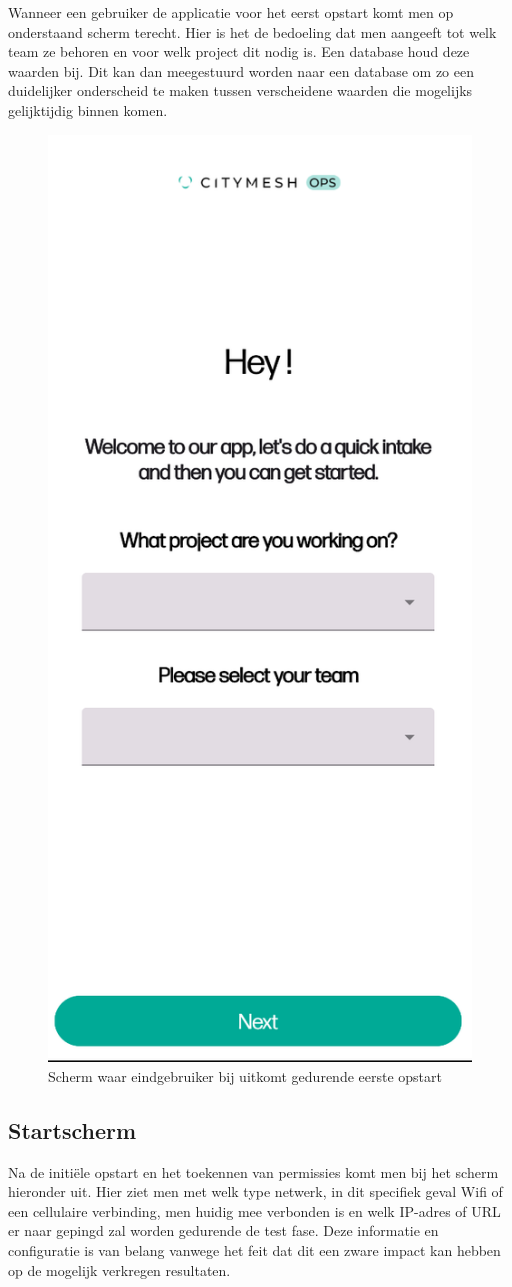 Wanneer een gebruiker de applicatie voor het eerst opstart komt men op onderstaand scherm terecht. Hier is het de bedoeling dat men aangeeft tot welk team ze behoren en voor welk project dit nodig is. Een database houd deze waarden bij. Dit kan dan meegestuurd worden naar een database om zo een duidelijker onderscheid te maken tussen verscheidene waarden die mogelijks gelijktijdig binnen komen. 

\begin{figure}[!htb]
    \includegraphics[width=0.3\linewidth]{graphics/startscreen}
    \caption[Scherm waar eindgebruiker bij uitkomt gedurende eerste opstart]{Scherm waar eindgebruiker bij uitkomt gedurende eerste opstart}
    \label{fig:startscreen}
\end{figure}

\subsection{Startscherm}

Na de initiële opstart en het toekennen van permissies komt men bij het scherm hieronder uit. Hier ziet men met welk type netwerk, in dit specifiek geval Wifi of een cellulaire verbinding, men huidig mee verbonden is en welk IP-adres of URL er naar gepingd zal worden gedurende de test fase. Deze informatie en configuratie is van belang vanwege het feit dat dit een zware impact kan hebben op de mogelijk verkregen resultaten.

